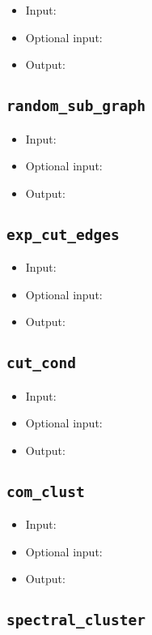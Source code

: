 \documentclass[10pt]{article}
\theoremstyle{definition}
\numberwithin{theorem}{section}
\numberwithin{definition}{section}
\numberwithin{lemma}{section}
\numberwithin{corollary}{section}
\numberwithin{clm}{section}
\numberwithin{rmk}{section}
\begin{document}
\begin{itemize}
	\item Input: 
	\item Optional input:
	\item Output: 
\end{itemize}

\cprotect \subsection{\verb|random_sub_graph|}

\begin{itemize}
	\item Input: 
	\item Optional input:
	\item Output: 
\end{itemize}

\cprotect \subsection{\verb|exp_cut_edges|}

\begin{itemize}
	\item Input: 
	\item Optional input:
	\item Output: 
\end{itemize}

\cprotect \subsection{\verb|cut_cond|}

\begin{itemize}
	\item Input: 
	\item Optional input:
	\item Output: 
\end{itemize}

\cprotect \subsection{\verb|com_clust|}

\begin{itemize}
	\item Input: 
	\item Optional input:
	\item Output: 
\end{itemize}

\cprotect \subsection{\verb|spectral_cluster|}
\end{document}
